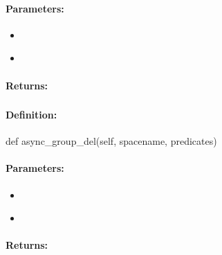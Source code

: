 \paragraph{Parameters:}
\begin{itemize}[noitemsep]
\item {}\\

\item {}\\

\end{itemize}

\paragraph{Returns:}


\pagebreak
\subsubsection{}
\label{api:python:async_group_del}


\paragraph{Definition:}
\begin{pythoncode}
def async_group_del(self, spacename, predicates)
\end{pythoncode}

\paragraph{Parameters:}
\begin{itemize}[noitemsep]
\item {}\\

\item {}\\

\end{itemize}

\paragraph{Returns:}


